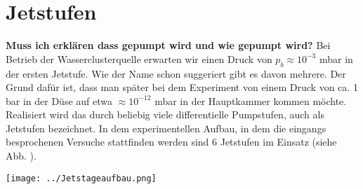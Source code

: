 \section{Jetstufen}

\textbf{Muss ich erklären dass gepumpt wird und wie gepumpt wird?}
Bei Betrieb der Wasserclusterquelle erwarten wir einen Druck von $p_b \approx 10^{-3}$ mbar in der ersten Jetstufe. Wie der Name schon suggeriert gibt es davon mehrere. Der Grund dafür ist, dass man später bei dem Experiment von einem Druck von ca. 1 bar in der Düse auf etwa $\approx 10^{-12}$ mbar in der Hauptkammer kommen möchte. Realisiert wird das durch beliebig viele differentielle Pumpstufen, auch als Jetstufen bezeichnet. In dem experimentellen Aufbau, in dem die eingangs besprochenen Versuche stattfinden werden sind 6 Jetstufen im Einsatz (siehe Abb. ).

\begin{center}
\begin{minipage}{\linewidth}
\centering
\texttt{[image: ../Jetstageaufbau.png]}%
 \label{fig:Jetstageaufbau}
\end{minipage} 
\end{center} 


